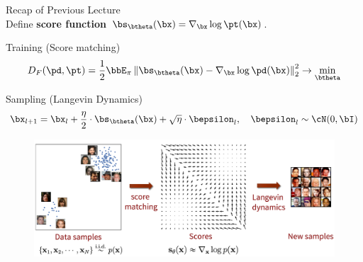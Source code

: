 \documentclass{beamer}
\begin{document}
\begin{frame}{Recap of Previous Lecture}
	\\
	Define \textbf{score function} $\bs_{\btheta}(\bx) = \nabla_{\bx}\log \pt(\bx)$.
	\begin{block}{Training (Score matching)}
		\vspace{-0.3cm}
		\[
			D_F(\pd, \pt) = \frac{1}{2}\bbE_{\pi}\left\| \bs_{\btheta}(\bx) - \nabla_\bx \log \pd(\bx) \right\|_2^2 \rightarrow \min_{\btheta}
		\]
		\vspace{-0.5cm}
	\end{block}
	\begin{block}{Sampling (Langevin Dynamics)}
		\vspace{-0.3cm}
		\[
			\bx_{l + 1} = \bx_l + \frac{\eta}{2} \cdot \bs_{\btheta}(\bx) + \sqrt{\eta} \cdot \bepsilon_l, \quad \bepsilon_l \sim \cN(0, \bI)
		\]
		\vspace{-0.7cm}
	\end{block}
	\begin{figure}
		\centering
		\includegraphics[width=0.8\linewidth]{figs/smld}
	\end{figure}
\end{frame}
\end{document}
